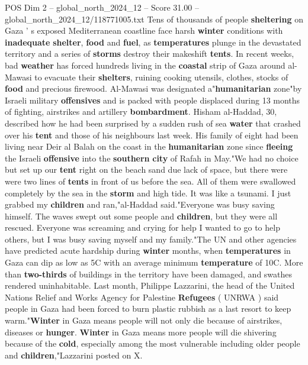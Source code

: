 \begin{textsample}{POS Dim 2 – global\_north\_2024\_12 – Score 31.00 – global\_north\_2024\_12/118771005.txt}  \label{ex:f2_pos_185}
Tens of thousands of people \textbf{sheltering} on Gaza ' s exposed Mediterranean coastline face harsh \textbf{winter} conditions with \textbf{inadequate} \textbf{shelter}, \textbf{food} and \textbf{fuel}, as \textbf{temperatures} plunge in the devastated territory and a series of \textbf{storms} destroy their makeshift \textbf{tents}.
In recent weeks, bad \textbf{weather} has forced hundreds living in the \textbf{coastal} strip of Gaza around al-Mawasi to evacuate their \textbf{shelters}, ruining cooking utensils, clothes, stocks of \textbf{food} and precious firewood.
Al-Mawasi was designated a"\textbf{humanitarian} zone"by Israeli military \textbf{offensives} and is packed with people displaced during 13 months of fighting, airstrikes and artillery \textbf{bombardment}.
Hisham al-Haddad, 30, described how he had been surprised by a sudden rush of sea \textbf{water} that crashed over his \textbf{tent} and those of his neighbours last week.
His family of eight had been living near Deir al Balah on the coast in the \textbf{humanitarian} zone since \textbf{fleeing} the Israeli \textbf{offensive} into the \textbf{southern} \textbf{city} of Rafah in May."We had no choice but set up our \textbf{tent} right on the beach sand due lack of space, but there were were two lines of \textbf{tents} in front of us before the sea.
All of them were swallowed completely by the sea in the \textbf{storm} and high tide.
It was like a tsunami.
I just grabbed my \textbf{children} and ran,"al-Haddad said."Everyone was busy saving himself.
The waves swept out some people and \textbf{children}, but they were all rescued.
Everyone was screaming and crying for help I wanted to go to help others, but I was busy saving myself and my family."The UN and other agencies have predicted acute hardship during \textbf{winter} months, when \textbf{temperatures} in Gaza can dip as low as 5C with an average minimum \textbf{temperature} of 10C.
More than \textbf{two-thirds} of buildings in the territory have been damaged, and swathes rendered uninhabitable.
Last month, Philippe Lazzarini, the head of the United Nations Relief and Works Agency for Palestine \textbf{Refugees} ( UNRWA ) said people in Gaza had been forced to burn plastic rubbish as a last resort to keep warm."\textbf{Winter} in Gaza means people will not only die because of airstrikes, diseases or \textbf{hunger}. \textbf{Winter} in Gaza means more people will die shivering because of the \textbf{cold}, especially among the most vulnerable including older people and \textbf{children},"Lazzarini posted on X.

\end{textsample}

